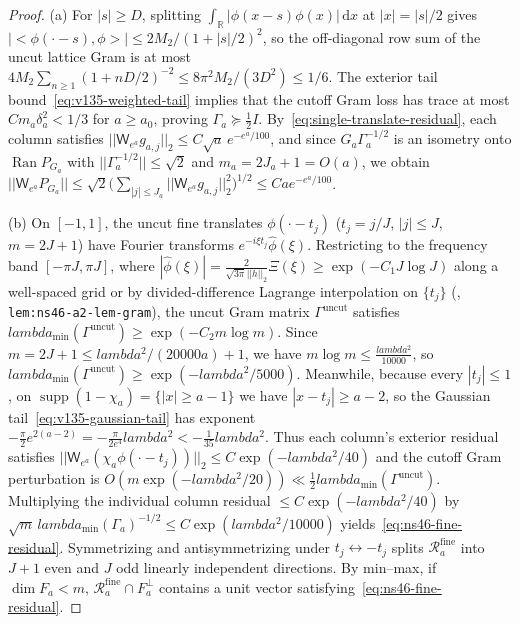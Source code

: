 \documentclass[11pt]{article}
\def\lambda{lambda}%
\def\norm#1{||#1||}%
\def\ip#1#2{<#1,#2>}%
\theoremstyle{remark}
\newcommand{\norm}[1]{\left\lVert #1\right\rVert}
\newcommand{\ip}[2]{\left\langle #1,#2\right\rangle}
\newcommand{\dd}{\mathrm d}
\begin{document}
\begin{proof}
(a) For $|s| \ge D$, splitting $\int_{\mathbb{R}} |\phi(x-s)\phi(x)|\,\dd x$ at $|x| = |s|/2$ gives $|\ip{\phi(\cdot-s)}{\phi}| \le 2M_2/(1+|s|/2)^2$, so the off-diagonal row sum of the uncut lattice Gram is at most $4M_2\sum_{n\ge 1}(1+nD/2)^{-2} \le 8\pi^2 M_2/(3D^2) \le 1/6$. The exterior tail bound~\eqref{eq:v135-weighted-tail} implies that the cutoff Gram loss has trace at most $C m_a \delta_a^2 < 1/3$ for $a \ge a_0$, proving $\Gamma_a \succeq \tfrac{1}{2}I$. By~\eqref{eq:single-translate-residual}, each column satisfies $\norm{\mathsf{W}_{e^a}g_{a,j}}_2 \le C\sqrt{a}\,e^{-e^a/100}$, and since $G_a\Gamma_a^{-1/2}$ is an isometry onto $\operatorname{Ran} P_{G_a}$ with $\norm{\Gamma_a^{-1/2}} \le \sqrt{2}$ and $m_a = 2J_a + 1 = O(a)$, we obtain $\norm{\mathsf{W}_{e^a}P_{G_a}} \le \sqrt{2}\bigl(\sum_{|j|\le J_a}\norm{\mathsf{W}_{e^a}g_{a,j}}_2^2\bigr)^{1/2} \le C a e^{-e^a/100}$.

(b) On $[-1,1]$, the uncut fine translates $\phi(\cdot - t_j)$ ($t_j = j/J$, $|j| \le J$, $m = 2J+1$) have Fourier transforms $e^{-i\xi t_j}\widehat{\phi}(\xi)$. Restricting to the frequency band $[-\pi J, \pi J]$, where $|\widehat{\phi}(\xi)| = \frac{2}{\sqrt{3\pi}\norm{h}_2}\Xi(\xi) \ge \exp(-C_1 J\log J)$ along a well-spaced grid or by divided-difference Lagrange interpolation on $\{t_j\}$ (, \texttt{lem:ns46-a2-lem-gram}), the uncut Gram matrix $\Gamma^{\mathrm{uncut}}$ satisfies $\lambda_{\min}(\Gamma^{\mathrm{uncut}}) \ge \exp(-C_2 m\log m)$. Since $m = 2J+1 \le \lambda^2/(20000a) + 1$, we have $m\log m \le \frac{\lambda^2}{10000}$, so $\lambda_{\min}(\Gamma^{\mathrm{uncut}}) \ge \exp(-\lambda^2/5000)$. Meanwhile, because every $|t_j| \le 1$, on $\operatorname{supp}(1-\chi_a) = \{|x| \ge a-1\}$ we have $|x - t_j| \ge a - 2$, so the Gaussian tail~\eqref{eq:v135-gaussian-tail} has exponent $-\frac{\pi}{2}e^{2(a-2)} = -\frac{\pi}{2e^4}\lambda^2 < -\frac{1}{35}\lambda^2$. Thus each column's exterior residual satisfies $\norm{\mathsf{W}_{e^a}(\chi_a\phi(\cdot - t_j))}_2 \le C\exp(-\lambda^2/40)$ and the cutoff Gram perturbation is $O(m\exp(-\lambda^2/20)) \ll \frac{1}{2}\lambda_{\min}(\Gamma^{\mathrm{uncut}})$. Multiplying the individual column residual $\le C\exp(-\lambda^2/40)$ by $\sqrt{m}\,\lambda_{\min}(\Gamma_a)^{-1/2} \le C\exp(\lambda^2/10000)$ yields~\eqref{eq:ns46-fine-residual}. Symmetrizing and antisymmetrizing under $t_j \leftrightarrow -t_j$ splits $\mathcal{R}_a^{\mathrm{fine}}$ into $J+1$ even and $J$ odd linearly independent directions. By min--max, if $\dim F_a < m$, $\mathcal{R}_a^{\mathrm{fine}} \cap F_a^\perp$ contains a unit vector satisfying~\eqref{eq:ns46-fine-residual}.
\end{proof}
\end{document}
